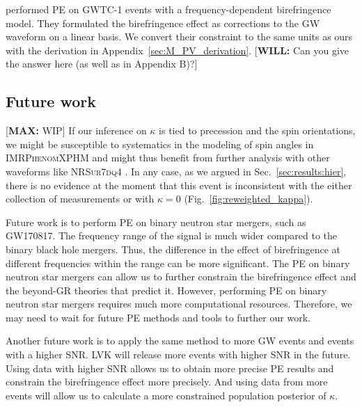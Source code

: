 \documentclass[aps,prd,twocolumn,superscriptaddress,preprintnumbers,floatfix,nofootinbib]{revtex4-2}
\newcommand*{\mi}[1]{\textsf{\color{magenta} [\textbf{MAX:} #1]}}
\newcommand*{\wf}[1]{\textsf{\color{cyan} [\textbf{WILL:} #1]}}
\begin{document}
\citet{Wang_2021} performed \ac{PE} on GWTC-1 events with a frequency-dependent birefringence model.
They formulated the birefringence effect as corrections to the GW waveform on a linear basis.
We convert their constraint to the same units as ours with the derivation in Appendix~\ref{sec:M_PV_derivation}.  \wf{Can you give the answer here (as well as in Appendix B)?}

\subsection{Future work}

\mi{WIP}
If our inference on $\kappa$ is tied to precession and the spin orientations, we might be susceptible to systematics in the modeling of spin angles in \textsc{IMRPhenomXPHM} and might thus benefit from further analysis with other waveforms like \textsc{NRSur7dq4} \cite{Varma:2018mmi}.
In any case, as we argued in Sec.~\ref{sec:results:hier}, there is no evidence at the moment that this event is inconsistent with the either collection of measurements or with $\kappa = 0$ (Fig.~\ref{fig:reweighted_kappa}).

Future work is to perform \ac{PE} on binary neutron star mergers, such as GW170817.
The frequency range of the signal is much wider compared to the binary black hole mergers.
Thus, the difference in the effect of birefringence at different frequencies within the range can be more significant.
The \ac{PE} on binary neutron star mergers can allow us to further constrain the birefringence effect and the beyond-GR theories that predict it.
However, performing \ac{PE} on binary neutron star mergers requires much more computational resources.
Therefore, we may need to wait for future \ac{PE} methods and tools to further our work.

Another future work is to apply the same method to more \ac{GW} events and events with a higher \ac{SNR}.
\ac{LVK} will release more events with higher \ac{SNR} in the future.
Using data with higher \ac{SNR} allows us to obtain more precise \ac{PE} results and constrain the birefringence effect more precisely.
And using data from more events will allow us to calculate a more constrained population posterior of $\kappa$.
\end{document}
